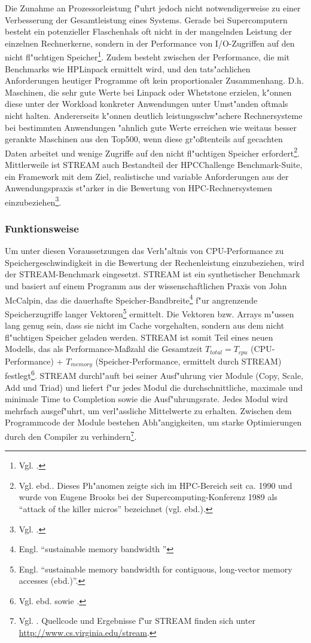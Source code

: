 Die Zunahme an Prozessorleistung f"uhrt jedoch nicht notwendigerweise zu einer Verbesserung der Gesamtleistung eines Systems. Gerade bei Supercomputern besteht ein potenzieller Flaschenhals oft nicht in der mangelnden Leistung der einzelnen Rechnerkerne, sondern in der Performance von I/O-Zugriffen auf den nicht fl"uchtigen Speicher\footnote{Vgl. \cite{mcc95}.}. Zudem besteht zwischen der Performance, die mit Benchmarks wie HPLinpack ermittelt wird, und den tats"achlichen Anforderungen heutiger Programme oft kein proportionaler Zusammenhang. D.h. Maschinen, die sehr gute Werte bei Linpack oder Whetstone erzielen, k"onnen diese unter der Workload konkreter Anwendungen unter Umst"anden oftmals nicht halten. Andererseits k"onnen deutlich leistungsschw"achere Rechnersysteme bei bestimmten Anwendungen "ahnlich gute Werte erreichen wie weitaus besser gerankte Maschinen aus den Top500, wenn diese gr"o\ss tenteils auf gecachten Daten arbeitet und wenige Zugriffe auf den nicht fl"uchtigen Speicher erfordert\footnote{Vgl. ebd.. Dieses Ph"anomen zeigte sich im HPC-Bereich seit ca. 1990 und wurde von Eugene Brooks bei der Supercomputing-Konferenz 1989 als "`attack of the killer micros"' bezeichnet (vgl. ebd.).}. Mittlerweile ist STREAM auch Bestandteil der HPCChallenge Benchmark-Suite, ein Framework mit dem Ziel, realistische und variable Anforderungen aus der Anwendungspraxis st"arker in die Bewertung von HPC-Rechnersystemen einzubeziehen\footnote{Vgl. \cite{lus05}.}.

\subsubsection{Funktionsweise}\label{Funktionsweise STREAM}

Um unter diesen Voraussetzungen das Verh"altnis von CPU-Performance zu Speichergeschwindigkeit in die Bewertung der Rechenleistung einzubeziehen, wird der STREAM-Bench\-mark eingesetzt. STREAM ist ein synthetischer Benchmark und basiert auf einem Programm aus der wissenschaftlichen Praxis von John McCalpin, das die dauerhafte Speicher-Bandbreite\footnote{Engl. "`sustainable memory bandwidth \cite{mcc95}"'} f"ur angrenzende Speicherzugriffe langer Vektoren\footnote{Engl. "`sustainable memory bandwidth for contiguous, long-vector memory accesses (ebd.)"'.} ermittelt. Die Vektoren bzw. Arrays m"ussen lang genug sein, dass sie nicht im Cache vorgehalten, sondern aus dem nicht fl"uchtigen Speicher geladen werden. STREAM ist somit Teil eines neuen Modells, das als Performance-Ma\ss zahl die Gesamtzeit $T_{total} = T_{cpu}$ (CPU-Performance) + $T_{memory}$ (Speicher-Performance, ermittelt durch STREAM) festlegt\footnote{Vgl. ebd. sowie \cite{mcc05}.}. 
\enlargethispage*{2cm}
STREAM durchl"auft bei seiner Ausf"uhrung vier Module (Copy, Scale, Add und Triad) und liefert f"ur jedes Modul die durchschnittliche, maximale und minimale Time to Completion sowie die Ausf"uhrungsrate. Jedes Modul wird mehrfach ausgef"uhrt, um verl"assliche Mittelwerte zu erhalten. Zwischen dem Programmcode der Module bestehen Abh"angigkeiten, um starke Optimierungen durch den Compiler zu verhindern\footnote{Vgl. \cite{mcc05}. Quellcode und Ergebnisse f"ur STREAM finden sich unter \url{http://www.cs.virginia.edu/stream}.}.   

